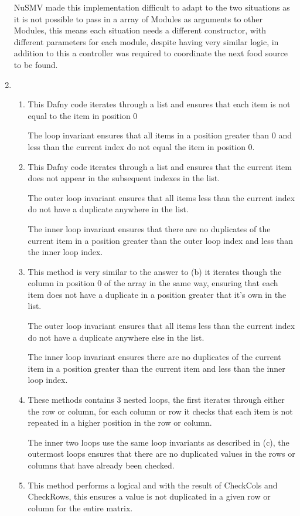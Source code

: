 \documentclass[12pt, a4paper]{article}
\begin{document}
\begin{enumerate}
NuSMV made this implementation difficult to adapt to the two situations as it is not possible to pass in a array of Modules as arguments to other Modules, this means each situation needs a different constructor, with different parameters for each module, despite having very similar logic, in addition to this a controller was required to coordinate the next food source to be found.

\item
	\begin{enumerate}
	\item This Dafny code iterates through a list and ensures that each item is not equal to the item in position 0
	
	The loop invariant ensures that all items in a position greater than 0 and less than the current index do not equal the item in position 0.
	
	\item This Dafny code iterates through a list and ensures that the current item does not appear in the subsequent indexes in the list.
	
	The outer loop invariant ensures that all items less than the current index do not have a duplicate anywhere in the list.
	
	The inner loop invariant ensures that there are no duplicates of the current item in a position greater than the outer loop index and less than the inner loop index.
	
		
	\item This method is very similar to the answer to (b) it iterates though the column in position 0 of the array in the same way, ensuring that each item does not have a duplicate in a position greater that it's own in the list.
	
	The outer loop invariant ensures that all items less than the current index do not have a duplicate anywhere else in the list.
	
	The inner loop invariant ensures there are no duplicates of the current item in a position greater than the current item and less than the inner loop index. 
	
	\item These methods contains 3 nested loops, the first iterates through either the row or column, for each column or row  it checks that each item is not repeated in a higher position in the row or column. 
	
	The inner two loops use the same loop invariants as described in (c), the outermost loops ensures that there are no duplicated values in the rows or columns that have already been checked.
	
	\item This method performs a logical and with the result of CheckCols and CheckRows, this ensures a value is not duplicated in a given row or column for the entire matrix.
	\end{enumerate}

	

\end{enumerate}

\printbibliography[heading=bibintoc, title={References}]
\end{document}
